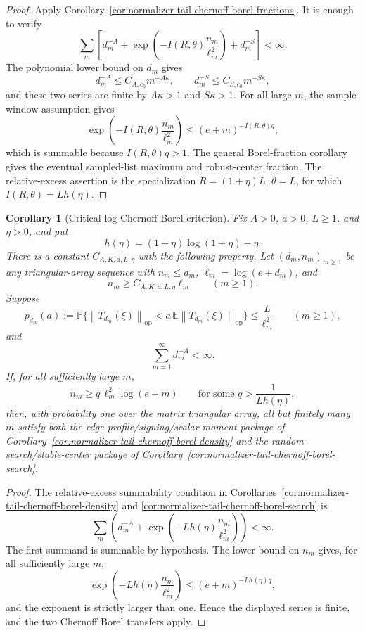 \documentclass[11pt]{amsart}
\numberwithin{equation}{section}
\newtheorem{corollary}[theorem]{Corollary}
\theoremstyle{definition}
\theoremstyle{remark}
\newcommand{\op}{\mathrm{op}}
\newcommand{\Prob}{\mathbb P}
\newcommand{\Exp}{\mathbb E}
\newcommand{\norm}[1]{\left\lVert #1\right\rVert}
\begin{document}
\begin{proof}
Apply Corollary~\ref{cor:normalizer-tail-chernoff-borel-fractions}.  It is
enough to verify
\[
  \sum_m\left[
  d_m^{-A}
  +\exp\left(-I(R,\theta)\frac{n_m}{\ell_m^2}\right)
  +d_m^{-S}
  \right]<\infty .
\]
The polynomial lower bound on \(d_m\) gives
\[
  d_m^{-A}\le C_{A,c_0}m^{-A\kappa},
  \qquad
  d_m^{-S}\le C_{S,c_0}m^{-S\kappa},
\]
and these two series are finite by \(A\kappa>1\) and \(S\kappa>1\).  For all
large \(m\), the sample-window assumption gives
\[
  \exp\left(-I(R,\theta)\frac{n_m}{\ell_m^2}\right)
  \le (e+m)^{-I(R,\theta)q},
\]
which is summable because \(I(R,\theta)q>1\).  The general Borel-fraction
corollary gives the eventual sampled-list maximum and robust-center fraction.
The relative-excess assertion is the specialization \(R=(1+\eta)L\),
\(\theta=L\), for which \(I(R,\theta)=Lh(\eta)\).
\end{proof}

\begin{corollary}[Critical-log Chernoff Borel criterion]
\label{cor:normalizer-tail-chernoff-borel-critical}
Fix \(A>0\), \(a>0\), \(L\ge1\), and \(\eta>0\), and put
\[
  h(\eta)=(1+\eta)\log(1+\eta)-\eta .
\]
There is a constant \(C_{A,K,a,L,\eta}\) with the following property.  Let
\((d_m,n_m)_{m\ge1}\) be any triangular-array sequence with \(n_m\le d_m\),
\(\ell_m=\log(e+d_m)\), and
\[
  n_m\ge C_{A,K,a,L,\eta}\ell_m \qquad(m\ge1).
\]
Suppose
\[
  p_{d_m}(a):=
  \Prob\{\norm{T_{d_m}(\xi)}_{\op}
      <a\,\Exp\norm{T_{d_m}(\xi)}_{\op}\}
  \le \frac{L}{\ell_m^2}
  \qquad(m\ge1),
\]
and
\[
  \sum_{m=1}^\infty d_m^{-A}<\infty .
\]
If, for all sufficiently large \(m\),
\[
  n_m\ge q\,\ell_m^2\log(e+m)
  \qquad\text{for some } q>\frac1{Lh(\eta)},
\]
then, with probability one over the matrix triangular array, all but finitely
many \(m\) satisfy both the edge-profile/signing/scalar-moment package of
Corollary~\ref{cor:normalizer-tail-chernoff-borel-density} and the
random-search/stable-center package of
Corollary~\ref{cor:normalizer-tail-chernoff-borel-search}.
\end{corollary}

\begin{proof}
The relative-excess summability condition in
Corollaries~\ref{cor:normalizer-tail-chernoff-borel-density} and
\ref{cor:normalizer-tail-chernoff-borel-search} is
\[
  \sum_m\left(d_m^{-A}+
  \exp\left(-Lh(\eta)\frac{n_m}{\ell_m^2}\right)\right)<\infty .
\]
The first summand is summable by hypothesis.  The lower bound on \(n_m\) gives,
for all sufficiently large \(m\),
\[
  \exp\left(-Lh(\eta)\frac{n_m}{\ell_m^2}\right)
  \le (e+m)^{-Lh(\eta)q},
\]
and the exponent is strictly larger than one.  Hence the displayed series is
finite, and the two Chernoff Borel transfers apply.
\end{proof}
\end{document}
